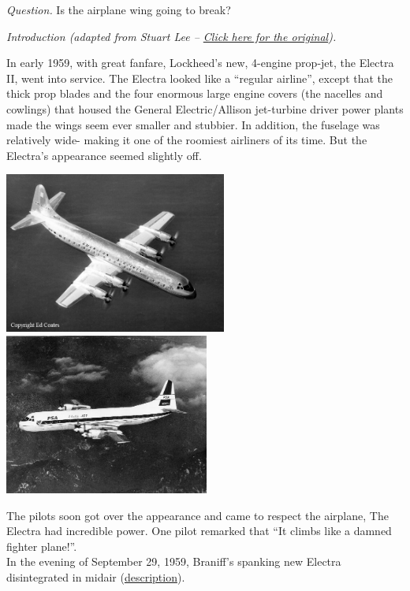 \emph{Question. } Is the airplane wing going to break? \\

\hfill

\emph{Introduction (adapted from Stuart Lee -- \href{https://people.cs.clemson.edu/~steve/Spiro/electra1.html}{Click here for the original}). } 

In early 1959, with great fanfare, Lockheed's new, 4-engine prop-jet, the Electra II, went into service. The Electra looked like a ``regular airline'', except that the thick prop blades and the four enormous large engine covers (the nacelles and cowlings) that housed the General Electric/Allison jet-turbine driver power plants made the wings seem ever smaller and stubbier. In addition, the fuselage was relatively wide- making it one of the roomiest airliners of its time. But the Electra's appearance seemed slightly off.

\begin{center}
\includegraphics*[height=150pt]{images/project-wing-Electra_1959.jpg}
\qquad
\includegraphics*[height=150pt]{images/project-wing-Electra_1960a.jpg}
\end{center}

The pilots soon got over the appearance and came to respect the airplane, The Electra had incredible power. One pilot remarked that ``It climbs like a damned fighter plane!''. \\

In the evening of September 29, 1959, Braniff's spanking new Electra disintegrated in midair (\href{http://www.baaa-acro.com/1959/archives/crash-of-a-lockheed-l-188-electra-in-buffalo-34-killed/}{description}). \\

